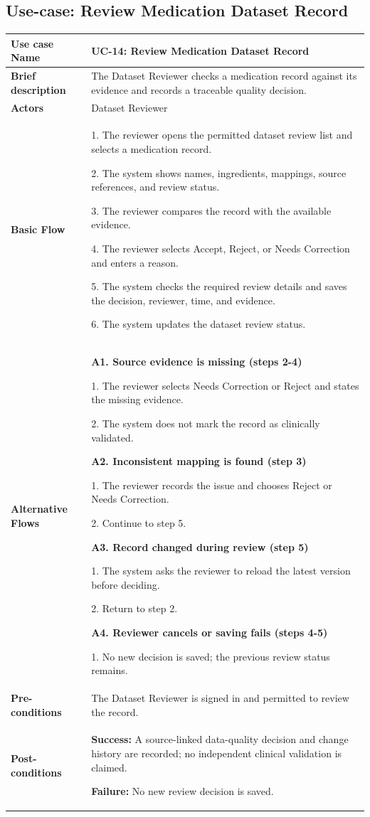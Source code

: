 
\clearpage
\subsection{Use-case: Review Medication Dataset Record}
\label{uc:uc-14}
\begin{longtable}{|p{}|p{}|}
\hline
\textbf{Use case Name} & UC-14: Review Medication Dataset Record \\ \hline
\textbf{Brief description} & The Dataset Reviewer checks a medication record against its evidence and records a traceable quality decision. \\ \hline
\textbf{Actors} & Dataset Reviewer \\ \hline
\textbf{Basic Flow} &
1. The reviewer opens the permitted dataset review list and selects a medication record.\par
2. The system shows names, ingredients, mappings, source references, and review status.\par
3. The reviewer compares the record with the available evidence.\par
4. The reviewer selects Accept, Reject, or Needs Correction and enters a reason.\par
5. The system checks the required review details and saves the decision, reviewer, time, and evidence.\par
6. The system updates the dataset review status.
\\ \hline
\textbf{Alternative Flows} &
\textbf{A1. Source evidence is missing (steps 2-4)}\par
1. The reviewer selects Needs Correction or Reject and states the missing evidence.\par
2. The system does not mark the record as clinically validated.
\par\smallskip
\textbf{A2. Inconsistent mapping is found (step 3)}\par
1. The reviewer records the issue and chooses Reject or Needs Correction.\par
2. Continue to step 5.
\par\smallskip
\textbf{A3. Record changed during review (step 5)}\par
1. The system asks the reviewer to reload the latest version before deciding.\par
2. Return to step 2.
\par\smallskip
\textbf{A4. Reviewer cancels or saving fails (steps 4-5)}\par
1. No new decision is saved; the previous review status remains.
\\ \hline
\textbf{Pre-conditions} & The Dataset Reviewer is signed in and permitted to review the record. \\ \hline
\textbf{Post-conditions} & \textbf{Success:} A source-linked data-quality decision and change history are recorded; no independent clinical validation is claimed.\par
\textbf{Failure:} No new review decision is saved. \\ \hline
\end{longtable}

